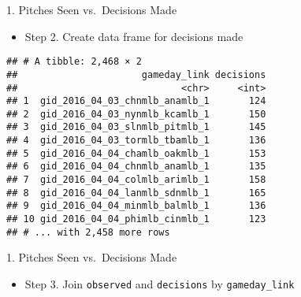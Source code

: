\begin{frame}[fragile]{1. Pitches Seen vs.~Decisions Made}

\begin{itemize}

\item
  Step 2. Create data frame for decisions made
\end{itemize}

\footnotesize

\begin{Shaded}
\end{Shaded}

\begin{verbatim}
## # A tibble: 2,468 × 2
##                      gameday_link decisions
##                             <chr>     <int>
## 1  gid_2016_04_03_chnmlb_anamlb_1       124
## 2  gid_2016_04_03_nynmlb_kcamlb_1       150
## 3  gid_2016_04_03_slnmlb_pitmlb_1       145
## 4  gid_2016_04_03_tormlb_tbamlb_1       136
## 5  gid_2016_04_04_chamlb_oakmlb_1       153
## 6  gid_2016_04_04_chnmlb_anamlb_1       135
## 7  gid_2016_04_04_colmlb_arimlb_1       158
## 8  gid_2016_04_04_lanmlb_sdnmlb_1       165
## 9  gid_2016_04_04_minmlb_balmlb_1       136
## 10 gid_2016_04_04_phimlb_cinmlb_1       123
## # ... with 2,458 more rows
\end{verbatim}

\end{frame}

\begin{frame}[fragile]{1. Pitches Seen vs.~Decisions Made}

\begin{itemize}

\item
  Step 3. Join \texttt{observed} and \texttt{decisions} by
  \texttt{gameday\_link}
\end{itemize}

\footnotesize

\begin{Shaded}
\begin{Highlighting}[]
\StringTok{ } \NormalTok{)}
\end{Highlighting}
\end{Shaded}

\end{frame}

